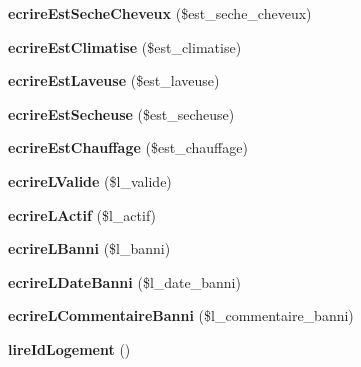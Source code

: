 \begin{DoxyCompactItemize}
\item 
\mbox{\label{class_logement_ac08347882cedd541c5aba8febf8bc7d2}} 
{\bfseries ecrire\+Est\+Seche\+Cheveux} (\$est\+\_\+seche\+\_\+cheveux)
\item 
\mbox{\label{class_logement_ac13aec80e7bfe3cb4089b79e20121d78}} 
{\bfseries ecrire\+Est\+Climatise} (\$est\+\_\+climatise)
\item 
\mbox{\label{class_logement_a1205439856615d4e53e11b173b81bd6b}} 
{\bfseries ecrire\+Est\+Laveuse} (\$est\+\_\+laveuse)
\item 
\mbox{\label{class_logement_ad6bd9c649aaa0d89638c0aca8fd538e2}} 
{\bfseries ecrire\+Est\+Secheuse} (\$est\+\_\+secheuse)
\item 
\mbox{\label{class_logement_a9657fbe1663594fcf952a342f701537a}} 
{\bfseries ecrire\+Est\+Chauffage} (\$est\+\_\+chauffage)
\item 
\mbox{\label{class_logement_adfd79b03fd8988538d36702b86687e29}} 
{\bfseries ecrire\+L\+Valide} (\$l\+\_\+valide)
\item 
\mbox{\label{class_logement_ab4a80244dcbe2af0e85029bfb5f20909}} 
{\bfseries ecrire\+L\+Actif} (\$l\+\_\+actif)
\item 
\mbox{\label{class_logement_a3ba88c6d1a99851561f7d443a839ed79}} 
{\bfseries ecrire\+L\+Banni} (\$l\+\_\+banni)
\item 
\mbox{\label{class_logement_a865418962ae6409badfe01c0bbf082ba}} 
{\bfseries ecrire\+L\+Date\+Banni} (\$l\+\_\+date\+\_\+banni)
\item 
\mbox{\label{class_logement_a16f51a8c19361ef6b5fa039df670a4e1}} 
{\bfseries ecrire\+L\+Commentaire\+Banni} (\$l\+\_\+commentaire\+\_\+banni)
\item 
\mbox{\label{class_logement_a1c96fc1a2b14e1e937e94d8ad6624189}} 
{\bfseries lire\+Id\+Logement} ()
\item 
\mbox{\label{class_logement_a10ab3dc4135ac9592894c58829269cb5}} 

\end{DoxyCompactItemize}
